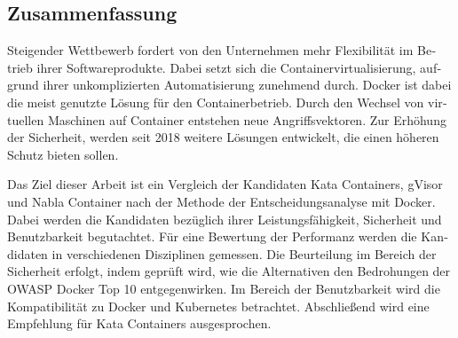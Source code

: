 \begin{otherlanguage}{ngerman}
	\chapter*{Zusammenfassung}
Steigender Wettbewerb fordert von den Unternehmen mehr Flexibilität im Betrieb ihrer Softwareprodukte. Dabei setzt sich die Containervirtualisierung, aufgrund ihrer unkomplizierten Automatisierung zunehmend durch. Docker ist dabei die meist genutzte Lösung für den Containerbetrieb. Durch den Wechsel von virtuellen Maschinen auf Container entstehen neue Angriffsvektoren. Zur Erhöhung der Sicherheit, werden seit 2018 weitere Lösungen entwickelt, die einen höheren Schutz bieten sollen.

Das Ziel dieser Arbeit ist ein Vergleich der Kandidaten Kata Containers, gVisor und Nabla Container nach der Methode der Entscheidungsanalyse mit Docker. Dabei werden die Kandidaten bezüglich ihrer Leistungsfähigkeit, Sicherheit und Benutzbarkeit begutachtet. Für eine Bewertung der Performanz werden die Kandidaten in verschiedenen Disziplinen gemessen. Die Beurteilung im Bereich der Sicherheit erfolgt, indem geprüft wird, wie die Alternativen den Bedrohungen der OWASP Docker Top 10 entgegenwirken. Im Bereich der Benutzbarkeit wird die Kompatibilität zu Docker und Kubernetes betrachtet. Abschließend wird eine Empfehlung für Kata Containers ausgesprochen.

\end{otherlanguage}
